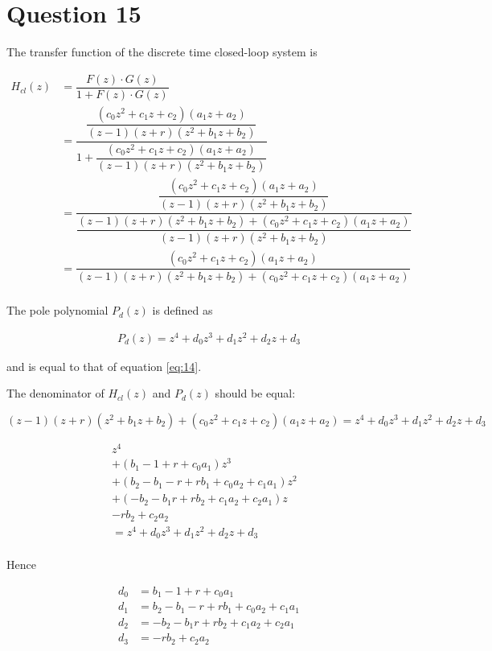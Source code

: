 \section{Question 15}

The transfer function of the discrete time closed-loop system is

\begin{align*}
  H_{cl}(z) &= \dfrac{F(z)\cdot G(z)}{1 + F(z)\cdot G(z)} \\
         &= \dfrac{\dfrac{(c_0z^2 + c_1z +c_2)(a_1z + a_2)}{(z-1)(z+r)(z^2 + b_1z + b_2)}}
            {1 + \dfrac{(c_0z^2 + c_1z +c_2)(a_1z + a_2)}{(z-1)(z+r)(z^2 + b_1z + b_2)}} \\
         &= \dfrac{\dfrac{(c_0z^2 + c_1z +c_2)(a_1z + a_2)}{(z-1)(z+r)(z^2 + b_1z + b_2)}}
            {\dfrac{(z-1)(z+r)(z^2 + b_1z + b_2) + (c_0z^2 + c_1z +c_2)(a_1z + a_2)}{(z-1)(z+r)(z^2 + b_1z + b_2)}}\\
         &= \dfrac{(c_0z^2 + c_1z +c_2)(a_1z + a_2)}{(z-1)(z+r)(z^2 + b_1z + b_2) + (c_0z^2 + c_1z +c_2)(a_1z + a_2)}\\
\end{align*}

The pole polynomial $P_d(z)$ is defined as

\begin{align*}
  P_d(z) = z^4 + d_0z^3 + d_1z^2 + d_2z + d_3
\end{align*}

and is equal to that of equation \ref{eq:14}.

The denominator of $H_{cl}(z)$ and $P_d(z)$ should be equal:

\begin{equation*}
  (z-1)(z+r)(z^2 + b_1z + b_2) + (c_0z^2 + c_1z +c_2)(a_1z + a_2) = z^4 + d_0z^3 + d_1z^2 + d_2z + d_3
\end{equation*}

\begin{align*}
  z^4 &\\
    + (b_1 - 1 + r + c_0a_1)z^3 &\\
    + (b_2 - b_1 -r + rb_1 +c_0a_2 + c_1a_1)z^2 &\\
    + (-b_2 - b_1r + rb_2 + c_1a_2 + c_2a_1)z &\\
    - rb_2 + c_2a_2 &\\
    =  z^4 + d_0z^3 + d_1z^2 + d_2z + d_3\\
\end{align*}

Hence

\begin{align*}
    d_0 &= b_1 - 1 + r + c_0a_1 \\
    d_1 &= b_2 - b_1 -r + rb_1 +c_0a_2 + c_1a_1 \\
    d_2 &= -b_2 - b_1r + rb_2 + c_1a_2 + c_2a_1 \\
    d_3 &= - rb_2 + c_2a_2 \\
\end{align*}

